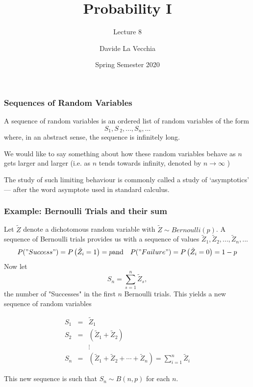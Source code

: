 \documentclass[notes=show,smaller,handout]{beamer}
\renewcommand{\Pr}{P}
\begin{document}
\title[S110015]{Probability I}
\subtitle{Lecture 8}
\author[La Vecchia]{Davide La Vecchia}
\date{Spring Semester 2020}
\maketitle


\begin{frame}%

\frametitle{Sequences of Random Variables }

\begin{definition}
 A sequence of random variables is an ordered list of random variables
of the form%
\begin{equation*}
S_{1},S\,_{2},...,S_{n},...
\end{equation*}
where, in an abstract sense, the sequence is infinitely long.
\end{definition}

\vspace{0.4cm} 

We would like to say something about how these random variables behave as $n$ gets larger and larger (i.e. as $n$
tends towards infinity, denoted by $n\rightarrow\infty$ )

\vspace{0.4cm} 
The study of such limiting behaviour is commonly called a study of \color{blue}`asymptotics' \color{black} --- after the word asymptote used in standard calculus.

\end{frame}%

\begin{frame}%

\frametitle{Example: Bernoulli Trials and their sum}


Let $\tilde Z$ denote a dichotomous random variable with $\tilde Z\sim Bernoulli(p)$. A sequence of Bernoulli trials provides us with a sequence of values $\tilde Z_{1},\tilde Z_{2},...,\tilde Z_{n},...$ %
\begin{eqnarray*}
\Pr("Success")=\Pr \left( \tilde Z_{i}=1\right) = p & \text{and} & \Pr("Failure")=\Pr \left( \tilde Z_{i}=0\right)  = 1-p
\end{eqnarray*}
Now let 
$$S_n=\sum_{s=1}^n \tilde Z_s,$$ the number of "Successes" in the first $n$ Bernoulli trials. This yields a new sequence of random variables
\begin{small}
\begin{eqnarray*}
S_{1} &=& \tilde Z_{1} \\
S_{2} &=&\left( \tilde Z_{1}+ \tilde Z_{2}\right)\\
&&\vdots  \\
S_{n} &=&\left( \tilde Z_{1}+ \tilde Z_{2}+\cdots + \tilde Z_{n}\right) = \sum_{i=1}^n \tilde Z_i
\end{eqnarray*}
\end{small}
This new sequence is such that $S_n\sim B(n,p)$ for each $n$.

\end{frame}%
\end{document}
